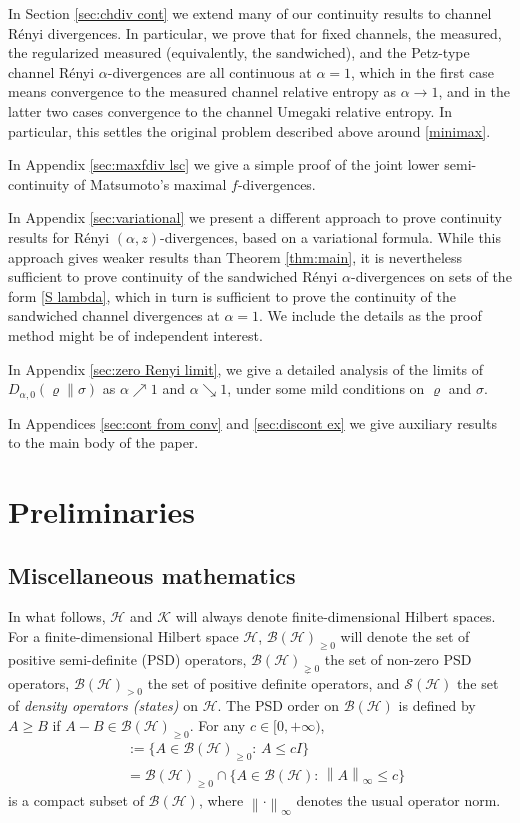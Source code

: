 \documentclass[unsortedaddress,superscriptaddress,pra,notitlepage]{revtex4}
\def\B{{\mathcal B}}
\def\S{{\mathcal S}}
\def\rho{\varrho}
\def\hil{{\mathcal H}}
\def\kil{{\mathcal K}}
\def\p{_{\ge 0}}
\def\pne{_{\gneq 0}}
\def\pp{_{>0}}
\def\valt{\cdot}
\newcommand{\ki}[1]{\textit{\textit{#1}}}
\newcommand{\norm}[1]{\left\| #1\right\|}
\begin{document}
In Section \ref{sec:chdiv cont} we extend many of our continuity 
results to channel R\'enyi divergences. In particular, we prove that 
for fixed channels, 
the measured, the 
regularized measured (equivalently, the sandwiched), and the Petz-type channel R\'enyi 
$\alpha$-divergences are all continuous at $\alpha=1$, which in the first case means 
convergence to the measured channel relative entropy as $\alpha\to 1$, and 
in the latter two cases convergence to the channel Umegaki relative entropy. 
In particular, this settles the original problem described above
around \eqref{minimax}.

In Appendix \ref{sec:maxfdiv lsc} we give a simple proof of the joint lower semi-continuity 
of Matsumoto's maximal $f$-divergences.

In Appendix \ref{sec:variational} we present a different approach to prove continuity 
results for R\'enyi $(\alpha,z)$-divergences, based on a variational formula. 
While this approach gives weaker results than Theorem \ref{thm:main}, it is nevertheless sufficient to prove continuity of the sandwiched R\'enyi $\alpha$-divergences on 
sets of the form \eqref{S lambda}, which in turn is sufficient to prove the continuity of the sandwiched channel divergences at $\alpha=1$. We include the details as the proof method
might be of independent interest.

In Appendix \ref{sec:zero Renyi limit}, we give a detailed analysis 
of the limits of $D_{\alpha,0}(\rho\|\sigma)$ as $\alpha\nearrow 1$ and 
$\alpha\searrow 1$, under some mild conditions on $\rho$ and $\sigma$.

In Appendices \ref{sec:cont from conv} and \ref{sec:discont ex} we give auxiliary results to the main body of the paper.



\section{Preliminaries}

\subsection{Miscellaneous mathematics}
\label{sec:miscmath}

In what follows, $\hil$ and $\kil$ will always denote finite-dimensional Hilbert spaces. 
For a finite-dimensional Hilbert space $\hil$, 
$\B(\hil)\p$ will denote the set of positive semi-definite (PSD) operators, 
$\B(\hil)\pne$ the set of non-zero PSD operators, 
$\B(\hil)\pp$ the set of positive definite operators, 
and 
$\S(\hil)$ the set of \ki{density operators (states)} on $\hil$.
The PSD order on $\B(\hil)$ is defined by $A\ge B$ if $A-B\in\B(\hil)\p$.
For any $c\in[0,+\infty)$, 
\begin{align*}
[0,cI]
&:=\{A\in\B(\hil)\p:\,A\le c I\}\\
&=
\B(\hil)\p\cap\{A\in\B(\hil):\,\norm{A}_{\infty}\le c\}
\end{align*}
is a compact subset of $\B(\hil)$, where 
$\norm{\valt}_{\infty}$ denotes the usual operator norm.
\end{document}

